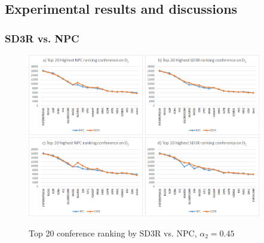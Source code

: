 \documentclass[10pt,leqno,twoside]{article}
\begin{document}
\subsection{Experimental results and discussions}\label{Sect:Result}

\subsubsection{SD3R vs. NPC}
%
\begin{figure} %
	\caption{Top 20 conference ranking by SD3R vs. NPC, $\alpha_2=0.45$}
	\label{Fig:Top20Conference}
    \centering
    \includegraphics[width=0.45\textwidth]{D1t20cNPC}
    \includegraphics[width=0.45\textwidth]{D1t20cSD3R}
    \includegraphics[width=0.45\textwidth]{D2t20cNPC}
    \includegraphics[width=0.45\textwidth]{D2t20cSD3R}
\end{figure}
\end{document}
